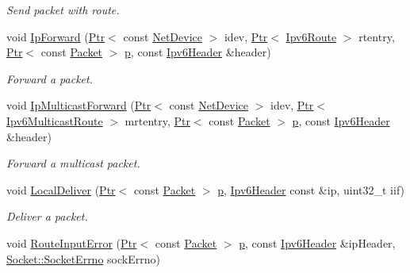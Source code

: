 \begin{DoxyCompactItemize}
\begin{DoxyCompactList}\small\item\em Send packet with route. \end{DoxyCompactList}\item 
void \hyperlink{classns3_1_1Ipv6L3Protocol_ac956e0aaed5e961b6c25210c2b696da6}{Ip\+Forward} (\hyperlink{classns3_1_1Ptr}{Ptr}$<$ const \hyperlink{classns3_1_1NetDevice}{Net\+Device} $>$ idev, \hyperlink{classns3_1_1Ptr}{Ptr}$<$ \hyperlink{classns3_1_1Ipv6Route}{Ipv6\+Route} $>$ rtentry, \hyperlink{classns3_1_1Ptr}{Ptr}$<$ const \hyperlink{classns3_1_1Packet}{Packet} $>$ \hyperlink{lte__link__budget__x2__handover__measures_8m_ac9de518908a968428863f829398a4e62}{p}, const \hyperlink{classns3_1_1Ipv6Header}{Ipv6\+Header} \&header)
\begin{DoxyCompactList}\small\item\em Forward a packet. \end{DoxyCompactList}\item 
void \hyperlink{classns3_1_1Ipv6L3Protocol_aa65d2e4894ea499415227e232e854824}{Ip\+Multicast\+Forward} (\hyperlink{classns3_1_1Ptr}{Ptr}$<$ const \hyperlink{classns3_1_1NetDevice}{Net\+Device} $>$ idev, \hyperlink{classns3_1_1Ptr}{Ptr}$<$ \hyperlink{classns3_1_1Ipv6MulticastRoute}{Ipv6\+Multicast\+Route} $>$ mrtentry, \hyperlink{classns3_1_1Ptr}{Ptr}$<$ const \hyperlink{classns3_1_1Packet}{Packet} $>$ \hyperlink{lte__link__budget__x2__handover__measures_8m_ac9de518908a968428863f829398a4e62}{p}, const \hyperlink{classns3_1_1Ipv6Header}{Ipv6\+Header} \&header)
\begin{DoxyCompactList}\small\item\em Forward a multicast packet. \end{DoxyCompactList}\item 
void \hyperlink{classns3_1_1Ipv6L3Protocol_a8e2c7a80851d870812295c19dc908a38}{Local\+Deliver} (\hyperlink{classns3_1_1Ptr}{Ptr}$<$ const \hyperlink{classns3_1_1Packet}{Packet} $>$ \hyperlink{lte__link__budget__x2__handover__measures_8m_ac9de518908a968428863f829398a4e62}{p}, \hyperlink{classns3_1_1Ipv6Header}{Ipv6\+Header} const \&ip, uint32\+\_\+t iif)
\begin{DoxyCompactList}\small\item\em Deliver a packet. \end{DoxyCompactList}\item 
void \hyperlink{classns3_1_1Ipv6L3Protocol_a0cdd2195de560337df8dbe1a412cbaf6}{Route\+Input\+Error} (\hyperlink{classns3_1_1Ptr}{Ptr}$<$ const \hyperlink{classns3_1_1Packet}{Packet} $>$ \hyperlink{lte__link__budget__x2__handover__measures_8m_ac9de518908a968428863f829398a4e62}{p}, const \hyperlink{classns3_1_1Ipv6Header}{Ipv6\+Header} \&ip\+Header, \hyperlink{classns3_1_1Socket_ada1328c5ae0c28cb2a982caf8f6d6cca}{Socket\+::\+Socket\+Errno} sock\+Errno)

\end{DoxyCompactItemize}
